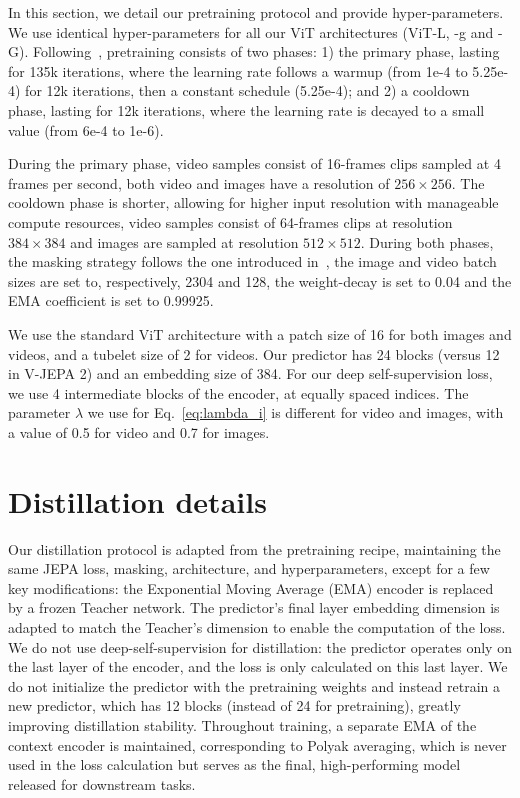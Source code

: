 \documentclass[]{fairmeta}
\begin{document}
In this section, we detail our pretraining protocol and provide hyper-parameters. We use identical hyper-parameters for all our ViT architectures (ViT-L, -g and -G). Following~\cite{assran2025v}, pretraining consists of two phases: 1) the primary phase, lasting for 135k iterations, where the learning rate follows a warmup (from 1e-4 to 5.25e-4) for 12k iterations, then a constant schedule (5.25e-4); and 2) a cooldown phase, lasting for 12k iterations, where the learning rate is decayed to a small value (from 6e-4 to 1e-6).

During the primary phase, video samples consist of 16-frames clips sampled at 4 frames per second, both video and images have a resolution of $256 \times 256$. The cooldown phase is shorter, allowing for higher input resolution with manageable compute resources, video samples consist of 64-frames clips at resolution $384 \times 384$ and images are sampled at resolution $512 \times 512$. During both phases, the masking strategy follows the one introduced in~\cite{bardes2024revisiting}, the image and video batch sizes are set to, respectively, 2304 and 128, the weight-decay is set to 0.04 and the EMA coefficient is set to 0.99925.

We use the standard ViT architecture with a patch size of 16 for both images and videos, and a tubelet size of 2 for videos. Our predictor has 24 blocks (versus 12 in V-JEPA 2) and an embedding size of 384. For our deep self-supervision loss, we use 4 intermediate blocks of the encoder, at equally spaced indices. The parameter $\lambda$ we use for Eq.~\ref{eq:lambda_i} is different for video and images, with a value of 0.5 for video and 0.7 for images.

\section{Distillation details} \label{app:distillation}

Our distillation protocol is adapted from the pretraining recipe, maintaining the same JEPA loss, masking, architecture, and hyperparameters, except for a few key modifications: the Exponential Moving Average (EMA) encoder is replaced by a frozen Teacher network. The predictor's final layer embedding dimension is adapted to match the Teacher's dimension to enable the computation of the loss. We do not use deep-self-supervision for distillation: the predictor operates only on the last layer of the encoder, and the loss is only calculated on this last layer. We do not initialize the predictor with the pretraining weights and instead retrain a new predictor, which has 12 blocks (instead of 24 for pretraining), greatly improving distillation stability. Throughout training, a separate EMA of the context encoder is maintained, corresponding to Polyak averaging, which is never used in the loss calculation but serves as the final, high-performing model released for downstream tasks. 
\end{document}
